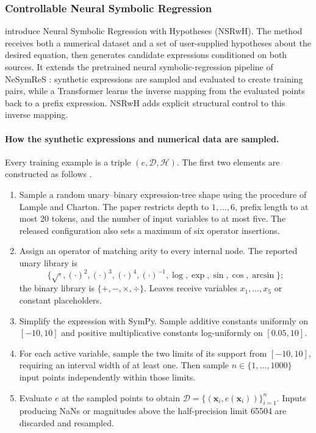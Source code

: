 \subsubsection{Controllable Neural Symbolic Regression}

\citet{bendinelli2023controllable} introduce Neural Symbolic Regression with
Hypotheses (NSRwH). The method receives both a numerical dataset and a set of
user-supplied hypotheses about the desired equation, then generates candidate
expressions conditioned on both sources. It extends the pretrained neural
symbolic-regression pipeline of NeSymReS \citep{biggio2021neural}: synthetic
expressions are sampled and evaluated to create training pairs, while a
Transformer learns the inverse mapping from the evaluated points back to a
prefix expression. NSRwH adds explicit structural control to this inverse
mapping.

\paragraph{How the synthetic expressions and numerical data are sampled.}
Every training example is a triple $(e,\mathcal D,\mathcal H)$. The first two
elements are constructed as follows \citep{bendinelli2023controllable}.

\begin{enumerate}
    \item Sample a random unary--binary expression-tree shape using the
    procedure of Lample and Charton. The paper restricts depth to
    $1,\ldots,6$, prefix length to at most 20 tokens, and the number of input
    variables to at most five. The released configuration also sets a maximum
    of six operator insertions.

    \item Assign an operator of matching arity to every internal node. The
    reported unary library is
    \[
      \{\sqrt{\cdot},(\cdot)^2,(\cdot)^3,(\cdot)^4,
        (\cdot)^{-1},\log,\exp,\sin,\cos,\arcsin\};
    \]
    the binary library is $\{+,-,\times,\div\}$. Leaves receive variables
    $x_1,\ldots,x_5$ or constant placeholders.

    \item Simplify the expression with SymPy. Sample additive constants
    uniformly on $[-10,10]$ and positive multiplicative constants
    log-uniformly on $[0.05,10]$.

    \item For each active variable, sample the two limits of its support from
    $[-10,10]$, requiring an interval width of at least one. Then sample
    $n\in\{1,\ldots,1000\}$ input points independently within those limits.

    \item Evaluate $e$ at the sampled points to obtain
    $\mathcal D=\{(\mathbf x_i,e(\mathbf x_i))\}_{i=1}^{n}$. Inputs producing
    NaNs or magnitudes above the half-precision limit 65504 are discarded and
    resampled.
\end{enumerate}


